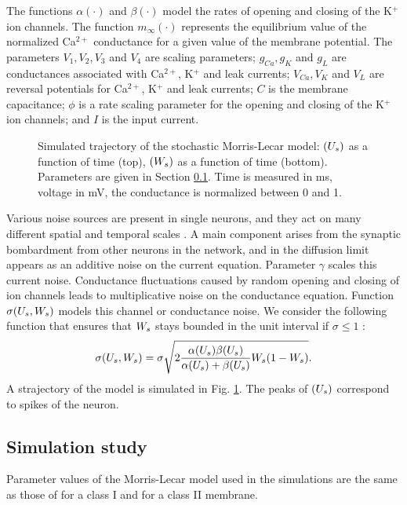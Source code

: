\documentclass{article}
\begin{document}
 The functions $\alpha
  (\cdot )$ and $\beta (\cdot )$ model the rates of opening and closing of the
  K$^+$ ion channels. The function $m_{\infty}(\cdot)$ represents the
  equilibrium value of the normalized Ca$^{2+}$ conductance for a given value of
  the membrane potential. The parameters $V_1, V_2, V_3$ and $V_4$ are scaling
  parameters; $g_{Ca}, g_K$ and $g_L$ are conductances associated with
  Ca$^{2+}$, K$^{+}$ and leak currents; $V_{Ca}, V_K$ and $V_L$ are reversal
  potentials for Ca$^{2+}$, K$^+$ and leak currents; $C$ is the membrane
  capacitance; $\phi$ is a rate scaling parameter for the opening and closing of
  the K$^+$ ion channels; and $I$ is the input current.


\begin{center}
\begin{figure}

\caption{Simulated trajectory of the stochastic 
  Morris-Lecar model: $({ U_s })$ as a function of time (top),
  $({ W_s })$ as a function of time (bottom). Parameters are given in Section
  \ref{sec:simulation}. Time is measured in ms, voltage in mV,
  the conductance is normalized between 0 and 1. }
 \label{fig:simu_ML} 
\end{figure}
\end{center}

Various noise sources are present in single neurons, and they act on many
different spatial and temporal scales \citep{Gerstner2005,Longtin2013}. A main
component arises from the synaptic bombardment from other neurons in the
network, and in the diffusion limit appears as an additive noise on the current
equation. Parameter $\gamma$ scales this current noise. Conductance fluctuations
caused by random opening and closing of ion channels leads to multiplicative
noise on the conductance equation. Function $\sigma({ U_s },{ W_s })$ models this
channel or conductance noise. We consider the following function that ensures
that ${ W_s }$ stays bounded in the unit interval  if $\sigma \leq 1$
\citep{DitlevsenGreenwood2011}: $$\sigma({ U_s }, { W_s } ) = \sigma \sqrt{2
\frac{\alpha({ U_s }) \beta({ U_s })}{\alpha({ U_s })+ \beta({ U_s })} { W_s } (1-{ W_s })}. $$
A strajectory of the model is simulated in Fig. \ref{fig:simu_ML}. The peaks of
$({ U_s })$ correspond to spikes of the neuron.

\subsection{Simulation study}\label{sec:simulation}
Parameter values of the Morris-Lecar model used in the simulations are the same
as those of \citep{RinzelErmentrout1989,Tateno2004} for a class I and for a
class II membrane.
 
\end{document}
